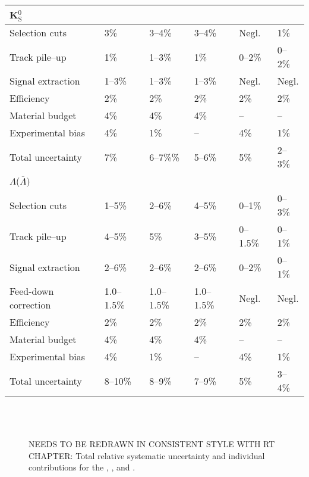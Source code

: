 \begin{table}[H]
\begin{tabular}{|l|lllll|}
\multicolumn{6}{l}{\parbox[b][1.2em]{1em}{K$^0_\mathrm{S}$}} \\
\hline
Selection cuts        & 3\%    & 3--4\%     & 3--4\%     & Negl.          & 1\%          \\
Track pile--up        & 1\% & 1--3\% & 1\% & 0--2\% & 0--2\%   \\
Signal extraction     & 1--3\%     & 1--3\%     & 1--3\%     & Negl. & Negl. \\
Efficiency            & 2\%    & 2\%    & 2\%    & 2\%         & 2\%         \\
Material budget       & 4\%    & 4\%    & 4\%    & --              & --              \\
Experimental bias     & 4\%    & 1\%    & --         & 4\%         & 1\%         \\ \hline
Total uncertainty     & 7\%    & 6--7\%\%   & 5--6\%     & 5\%         & 2--3\%          \\ \hline
\multicolumn{6}{l}{\parbox[b][1.2em]{1em}{$\Lambda$($\overline{\Lambda})$}} \\
\hline
Selection cuts & 1--5\%     & 2--6\%     & 4--5\%     & 0--1\%          & 0--3\%          \\
Track pile--up        & 4--5\% & 5\% & 3--5\% & 0--1.5\% & 0--1\%   \\
Signal extraction     & 2--6\%     & 2--6\%     & 2--6\%     & 0--2\%          & 0--1\%          \\
Feed-down correction   & 1.0--1.5\% & 1.0--1.5\% & 1.0--1.5\% & Negl. & Negl. \\
Efficiency            & 2\%    & 2\%    & 2\%    & 2\%         & 2\%         \\
Material budget       & 4\%    & 4\%    & 4\%    & --              & --              \\
Experimental bias     & 4\%    & 1\%    & --         & 4\%         & 1\%         \\ \hline
Total uncertainty     & 8--10\%    & 8--9\%     & 7--9\%     & 5\%         & 3--4\%          \\ \hline
\end{tabular}
\end{table}

\begin{figure}[H]
\centering
{}\\
\\
\caption{NEEDS TO BE REDRAWN IN CONSISTENT STYLE WITH RT CHAPTER: Total relative systematic uncertainty and individual contributions for the \KOs, \LA, and \AL .}
\label{fig:sphero:systtot}
\end{figure}


